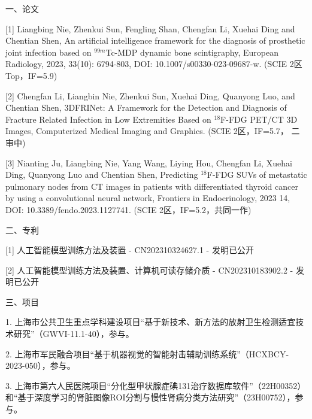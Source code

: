 \begin{publications}

    {\heiti 一、论文}

    [1] Liangbing Nie, Zhenkui Sun, Fengling Shan, Chengfan Li, Xuehai Ding and Chentian Shen, An artificial intelligence framework for the diagnosis of prosthetic joint infection based on \(^{99m}\)Tc-MDP dynamic bone scintigraphy, European Radiology, 2023, 33(10): 6794-803, DOI: 10.1007/s00330-023-09687-w. (SCIE 2区 Top，IF=5.9)

    [2] Chengfan Li, Liangbin Nie, Zhenkui Sun, Xuehai Ding, Quanyong Luo, and Chentian Shen, 3DFRINet: A Framework for the Detection and Diagnosis of Fracture Related Infection in Low Extremities Based on \(^{18}\)F-FDG PET/CT 3D Images, Computerized Medical Imaging and Graphics. (SCIE 2区，IF=5.7， 二审中)

    [3] Nianting Ju, Liangbing Nie, Yang Wang, Liying Hou, Chengfan Li, Xuehai Ding, Quanyong Luo and Chentian Shen, Predicting \(^{18}\)F-FDG SUVs of metastatic pulmonary nodes from CT images in patients with differentiated thyroid cancer by using a convolutional neural network, Frontiers in Endocrinology, 2023 14, DOI: 10.3389/fendo.2023.1127741. (SCIE 2区，IF=5.2，共同一作)

    {\heiti 二、专利}

        [1] 人工智能模型训练方法及装置 - CN202310324627.1 - 发明已公开

    [2] 人工智能模型训练方法及装置、计算机可读存储介质 - CN202310183902.2 - 发明已公开

    {\heiti 三、项目}

    1. 上海市公共卫生重点学科建设项目“基于新技术、新方法的放射卫生检测适宜技术研究”（GWVI-11.1-40），参与。

    2. 上海市军民融合项目“基于机器视觉的智能射击辅助训练系统”（HCXBCY-2023-050），参与。

    3. 上海市第六人民医院项目“分化型甲状腺症碘131治疗数据库软件”（22H00352）和“基于深度学习的肾脏图像ROI分割与慢性肾病分类方法研究”（23H00752），参与。

\end{publications}